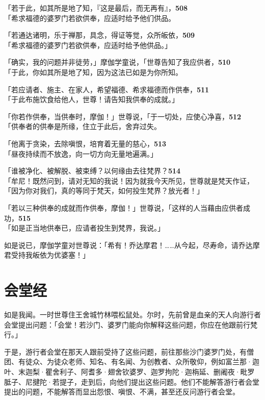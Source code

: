 「若于此，如其所是地了知，『这是最后，而无再有』，\hfill{\grayfootnotesize \textbf{508}} \\
「希求福德的婆罗门若欲供奉，应适时给予他们供品。


「若通达诸明，乐于禅那，具念，得证等觉，众所皈依，\hfill{\grayfootnotesize \textbf{509}} \\
「希求福德的婆罗门若欲供奉，应适时给予他供品。」


「确实，我的问题并非徒劳，」摩伽学童说，「世尊告知了我应供者，\hfill{\grayfootnotesize \textbf{510}} \\
「于此，你如其所是地了知，因为这法已如是为你所知。


「若应请者、施主、在家人，希望福德、希求福德而作供奉，\hfill{\grayfootnotesize \textbf{511}} \\
「于此布施饮食给他人，世尊！请告知我供奉的成就。」


「你若作供奉，当供奉时，摩伽！」世尊说，「于一切处，应使心净喜，\hfill{\grayfootnotesize \textbf{512}} \\
「供奉者的供奉是所缘，住立于此后，舍弃过失。


「他离于贪染，去除嗔恨，培育着无量的慈心，\hfill{\grayfootnotesize \textbf{513}} \\
「昼夜持续而不放逸，向一切方向无量地遍满。」


「谁被净化、被解脱、被束缚？以何缘由去往梵界？\hfill{\grayfootnotesize \textbf{514}} \\
「牟尼！既然问到，请对无知的我说！因为就我今天所见，世尊就是梵天作证，\\
「因为你对我们，真的等同于梵天，如何投生梵界？放光者！」


「若以三种供奉的成就而作供奉，摩伽！」世尊说，「这样的人当藉由应供者成功，\hfill{\grayfootnotesize \textbf{515}} \\
「如是正当地供奉已，应请者投生到梵界，我说。」


如是说已，摩伽学童对世尊说：「希有！乔达摩君！……从今起，尽寿命，请乔达摩君受持我皈依为优婆塞！」

\section{会堂经}

如是我闻。一时世尊住王舍城竹林喂松鼠处。尔时，先前曾是血亲的天人向游行者会堂提出问题：「会堂！若沙门、婆罗门能向你解释这些问题，你应在他跟前行梵行。」


于是，游行者会堂在那天人跟前受持了这些问题，前往那些沙门婆罗门处，有僧团、有徒众、为徒众老师、知名、有名闻、为创教者、众所敬仰，例如富兰那·迦叶、末迦梨·瞿舍利子、阿耆多·翅舍钦婆罗、迦罗拘陀·迦栴延、删阇夜·毗罗胝子、尼揵陀·若提子，走到后，向他们提出这些问题。他们不能解答游行者会堂提出的问题，不能解答而显出怨恨、嗔恨、不满，甚至还反问游行者会堂。


